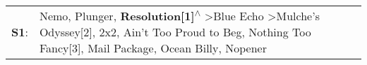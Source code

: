 \begin{supertabular}{p{0.03\textwidth}p{0.92\textwidth}}
 \textbf{S1}:  &  Nemo\textsuperscript{}, \enspace Plunger\textsuperscript{}, \enspace \textbf{Resolution[1]\textsuperscript{$\wedge$}} \textgreater \enspace Blue Echo\textsuperscript{} \textgreater \enspace Mulche's Odyssey[2]\textsuperscript{}, \enspace 2x2\textsuperscript{}, \enspace Ain't Too Proud to Beg\textsuperscript{}, \enspace Nothing Too Fancy[3]\textsuperscript{}, \enspace Mail Package\textsuperscript{}, \enspace Ocean Billy\textsuperscript{}, \enspace Nopener\textsuperscript{}  \enspace  \\
\end{supertabular}
